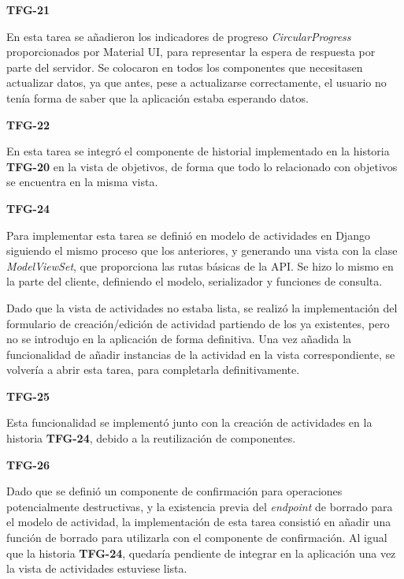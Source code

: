 \documentclass[10pt, a4paper]{aqademic}
\begin{document}
\medskip

\textbf{TFG-21}

En esta tarea se añadieron los indicadores de progreso \textit{CircularProgress} proporcionados por Material UI, para representar la espera de respuesta por parte del servidor. Se colocaron en todos los componentes que necesitasen actualizar datos, ya que antes, pese a actualizarse correctamente, el usuario no tenía forma de saber que la aplicación estaba esperando datos.

\medskip

\textbf{TFG-22}

En esta tarea se integró el componente de historial implementado en la historia \textbf{TFG-20} en la vista de objetivos, de forma que todo lo relacionado con objetivos se encuentra en la misma vista. 

\medskip

\textbf{TFG-24}

Para implementar esta tarea se definió en modelo de actividades en Django siguiendo el mismo proceso que los anteriores, y generando una vista con la clase \textit{ModelViewSet}, que proporciona las rutas básicas de la API. Se hizo lo mismo en la parte del cliente, definiendo el modelo, serializador y funciones de consulta. 

Dado que la vista de actividades no estaba lista, se realizó la implementación del formulario de creación/edición de actividad partiendo de los ya existentes, pero no se introdujo en la aplicación de forma definitiva. Una vez añadida la funcionalidad de añadir instancias de la actividad en la vista correspondiente, se volvería a abrir esta tarea, para completarla definitivamente.

\medskip

\textbf{TFG-25}

Esta funcionalidad se implementó junto con la creación de actividades en la historia \textbf{TFG-24}, debido a la reutilización de componentes.

\medskip

\textbf{TFG-26}

Dado que se definió un componente de confirmación para operaciones potencialmente destructivas, y la existencia previa del \textit{endpoint} de borrado para el modelo de actividad, la implementación de esta tarea consistió en añadir una función de borrado para utilizarla con el componente de confirmación. Al igual que la historia \textbf{TFG-24}, quedaría pendiente de integrar en la aplicación una vez la vista de actividades estuviese lista.
\end{document}

